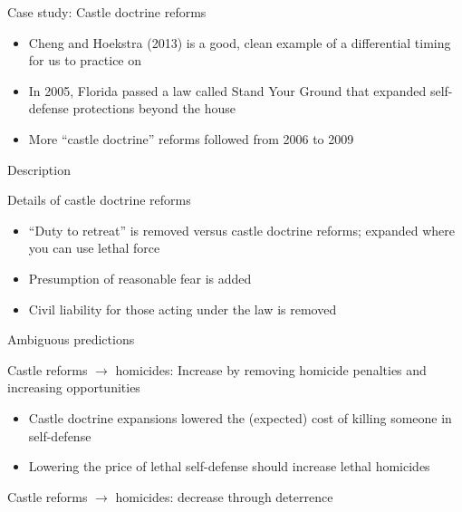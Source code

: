 \documentclass{beamer}
\begin{document}
\begin{frame}{Case study: Castle doctrine reforms}

\begin{itemize}

\item Cheng and Hoekstra (2013) is a good, clean example of a differential timing for us to practice on
\item In 2005, Florida passed a law called Stand Your Ground that expanded self-defense protections beyond the house
\item More ``castle doctrine'' reforms followed from 2006 to 2009

\end{itemize}

\end{frame}

\begin{frame}{Description}

Details of castle doctrine reforms
		\begin{itemize}
		\item ``Duty to retreat'' is removed versus castle doctrine reforms; expanded where you can use lethal force
		\item Presumption of reasonable fear is added
		\item Civil liability for those acting under the law is removed
		\end{itemize}
\end{frame}

\begin{frame}{Ambiguous predictions}
	
Castle reforms $\rightarrow$ homicides: Increase by removing homicide penalties and increasing opportunities
	\begin{itemize}
	\item Castle doctrine expansions lowered the (expected) cost of killing someone in self-defense
	\item Lowering the price of lethal self-defense should increase lethal homicides
	\end{itemize}
\bigskip
Castle reforms $\rightarrow$ homicides: decrease through deterrence

\end{frame}
\end{document}
